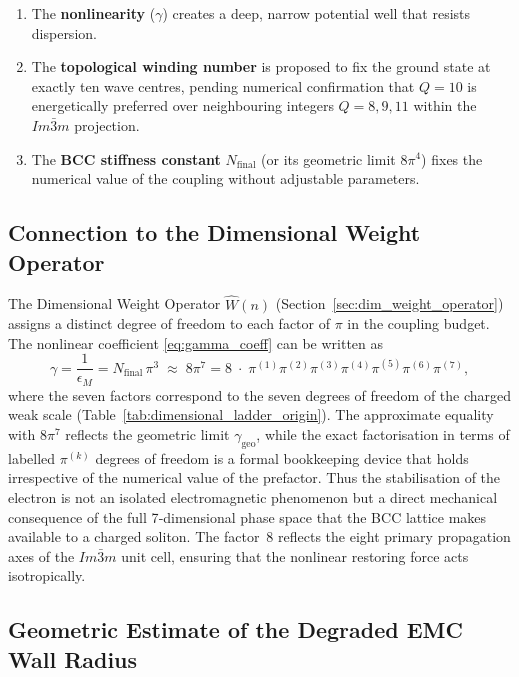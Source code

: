 \documentclass[10pt,a4paper]{article}
\begin{document}
\begin{enumerate}
	\item The \textbf{nonlinearity} ($\gamma$) creates a deep, narrow potential well that
	resists dispersion.
	\item The \textbf{topological winding number} is proposed to fix the ground state
	at exactly ten wave centres, pending numerical confirmation that $Q=10$ is
	energetically preferred over neighbouring integers $Q=8,9,11$ within the
	$Im\bar{3}m$ projection.
	\item The \textbf{BCC stiffness constant} $N_{\text{final}}$ (or its geometric
	limit $8\pi^{4}$) fixes the numerical value of the coupling without
	adjustable parameters.
\end{enumerate}

\subsection{Connection to the Dimensional Weight Operator}

The Dimensional Weight Operator $\hat{W}(n)$ (Section~\ref{sec:dim_weight_operator})
assigns a distinct degree of freedom to each factor of $\pi$ in the coupling
budget. The nonlinear coefficient \eqref{eq:gamma_coeff} can be written as
\begin{equation}
	\gamma = \frac{1}{\epsilon_{M}} = N_{\text{final}}\,\pi^{3}
	\;\approx\; 8\pi^{7}
	= 8\;\cdot\;\pi^{(1)}\pi^{(2)}\pi^{(3)}\pi^{(4)}\pi^{(5)}\pi^{(6)}\pi^{(7)},
\end{equation}
where the seven factors correspond to the seven degrees of freedom of the
charged weak scale (Table~\ref{tab:dimensional_ladder_origin}).  The approximate
equality with $8\pi^{7}$ reflects the geometric limit $\gamma_{\text{geo}}$,
while the exact factorisation in terms of labelled $\pi^{(k)}$ degrees of
freedom is a formal bookkeeping device that holds irrespective of the numerical
value of the prefactor.  Thus the stabilisation of the electron is not an
isolated electromagnetic phenomenon but a direct mechanical consequence of the
full 7‑dimensional phase space that the BCC lattice makes available to a
charged soliton. The factor~8 reflects the eight primary propagation axes of
the $Im\bar{3}m$ unit cell, ensuring that the nonlinear restoring force acts
isotropically.

\subsection{Geometric Estimate of the Degraded EMC Wall Radius}
\label{sec:wall_radius_estimate}
\end{document}

